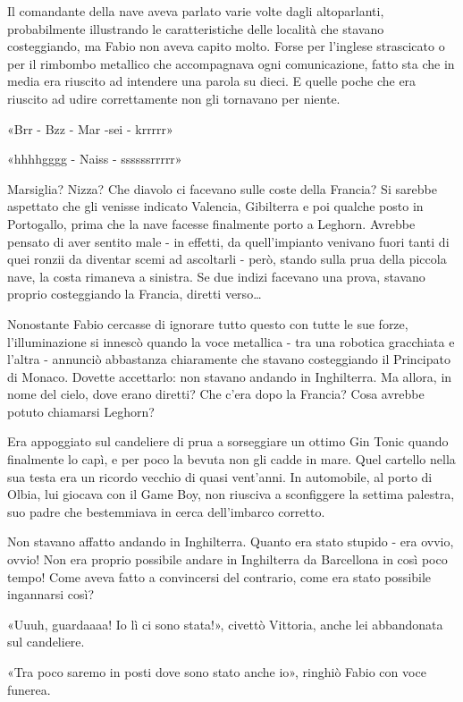 Il comandante della nave aveva parlato varie volte dagli altoparlanti, probabilmente illustrando le caratteristiche delle località che stavano costeggiando, ma Fabio non aveva capito molto. Forse per l'inglese strascicato o per il rimbombo metallico che accompagnava ogni comunicazione, fatto sta che in media era riuscito ad intendere una parola su dieci. E quelle poche che era riuscito ad udire correttamente non gli tornavano per niente.

«Brr - Bzz - Mar -sei - krrrrr»

«hhhhgggg - Naiss - ssssssrrrrr»

Marsiglia? Nizza? Che diavolo ci facevano sulle coste della Francia? Si sarebbe aspettato che gli venisse indicato Valencia, Gibilterra e poi qualche posto in Portogallo, prima che la nave facesse finalmente porto a Leghorn. Avrebbe pensato di aver sentito male - in effetti, da quell'impianto venivano fuori tanti di quei ronzii da diventar scemi ad ascoltarli - però, stando sulla prua della piccola nave, la costa rimaneva a sinistra. Se due indizi facevano una prova, stavano proprio costeggiando la Francia, diretti verso\ldots

Nonostante Fabio cercasse di ignorare tutto questo con tutte le sue forze, l'illuminazione si innescò quando la voce metallica - tra una robotica gracchiata e l'altra - annunciò abbastanza chiaramente che stavano costeggiando il Principato di Monaco. Dovette accettarlo: non stavano andando in Inghilterra. Ma allora, in nome del cielo, dove erano diretti? Che c'era dopo la Francia? Cosa avrebbe potuto chiamarsi Leghorn?

Era appoggiato sul candeliere di prua a sorseggiare un ottimo Gin Tonic quando finalmente lo capì, e per poco la bevuta non gli cadde in mare. Quel cartello nella sua testa era un ricordo vecchio di quasi vent'anni. In automobile, al porto di Olbia, lui giocava con il Game Boy, non riusciva a sconfiggere la settima palestra, suo padre che bestemmiava in cerca dell'imbarco corretto.

Non stavano affatto andando in Inghilterra. Quanto era stato stupido - era ovvio, ovvio! Non era proprio possibile andare in Inghilterra da Barcellona in così poco tempo! Come aveva fatto a convincersi del contrario, come era stato possibile ingannarsi così?

«Uuuh, guardaaaa! Io lì ci sono stata!», civettò Vittoria, anche lei abbandonata sul candeliere.

«Tra poco saremo in posti dove sono stato anche io», ringhiò Fabio con voce funerea.

